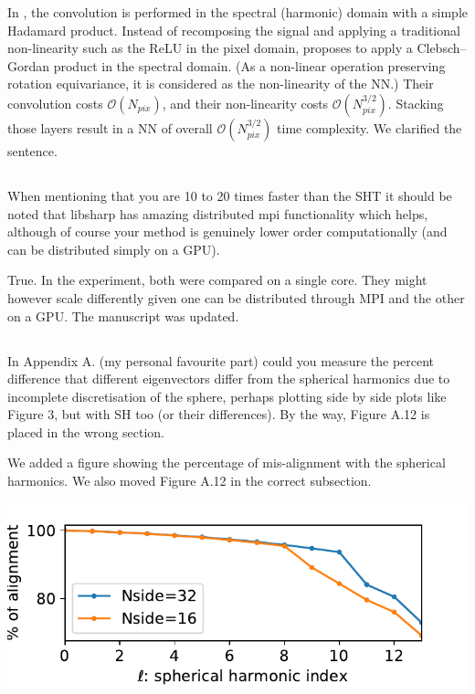 \documentclass[12pt,a4paper]{article}
\newcommand{\todo}[1]{{\color[rgb]{.6,.1,.6}{TODO: #1}}}
\newcommand{\1}{\b{1}}              %
\newcommand{\0}{\b{0}}              %
\begin{document}
In \cite{kondor2018clebsch}, the convolution is performed in the spectral (harmonic) domain with a simple Hadamard product.
Instead of recomposing the signal and applying a traditional non-linearity such as the ReLU in the pixel domain, \cite{kondor2018clebsch} proposes to apply a Clebsch–Gordan product in the spectral domain.
(As a non-linear operation preserving rotation equivariance, it is considered as the non-linearity of the NN.)
Their convolution costs $\mathcal{O}(N_{pix})$, and their non-linearity costs $\mathcal{O}(N^{3/2}_{pix})$.
Stacking those layers result in a NN of overall $\mathcal{O}(N^{3/2}_{pix})$ time complexity.
We clarified the sentence.

\subsection{}
\begin{mdframed}[style=comment]
When mentioning that you are 10 to 20 times faster than the SHT it should be noted that libsharp has amazing distributed mpi functionality which helps, although of course your method is genuinely lower order computationally (and can be distributed simply on a GPU).
\end{mdframed}

True.
In the experiment, both were compared on a single core.
They might however scale differently given one can be distributed through MPI and the other on a GPU.
The manuscript was updated.

\subsection{}
\begin{mdframed}[style=comment]
In Appendix A. (my personal favourite part) could you measure the percent difference that different eigenvectors differ from the spherical harmonics due to incomplete discretisation of the sphere, perhaps plotting side by side plots like Figure 3, but with SH too (or their differences). By the way, Figure A.12 is placed in the wrong section.
\end{mdframed}
\todo{Assigned: @nati, @michael}
We added a figure showing the percentage of mis-alignment with the spherical harmonics. We also moved Figure A.12 in the correct subsection.

\begin{center}
\includegraphics[width=0.5\linewidth]{figures/subspace_alignment_percentage.pdf}
\end{center}
\end{document}
